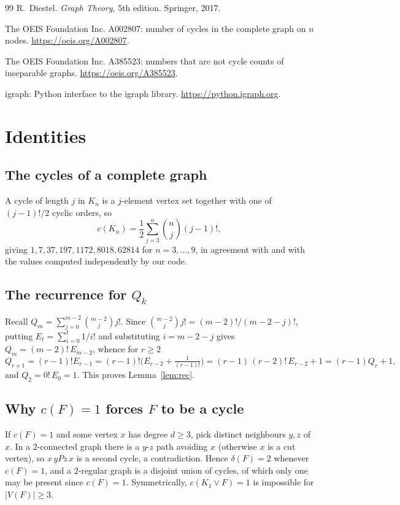 \documentclass[11pt,a4paper]{article}
\theoremstyle{definition}
\newcommand{\cF}{c(F)}
\begin{document}
\begin{thebibliography}{99}
R.~Diestel.
\newblock \emph{Graph Theory}, 5th edition.
\newblock Springer, 2017.

The OEIS Foundation Inc.
\newblock A002807: number of cycles in the complete graph on $n$ nodes.
\newblock \url{https://oeis.org/A002807}.

The OEIS Foundation Inc.
\newblock A385523: numbers that are not cycle counts of inseparable graphs.
\newblock \url{https://oeis.org/A385523}.

igraph: Python interface to the igraph library.
\newblock \url{https://python.igraph.org}.
\end{thebibliography}

\appendix

\section{Identities}\label{app:identities}

\subsection{The cycles of a complete graph}
A cycle of length $j$ in $K_n$ is a $j$-element vertex set together with one
of $(j-1)!/2$ cyclic orders, so
\[
  c(K_n)=\frac12\sum_{j=3}^{n}\binom nj (j-1)! ,
\]
giving $1,7,37,197,1172,8018,62814$ for $n=3,\dots,9$, in agreement with
\cite{oeisA002807} and with the values computed independently by our code.

\subsection{The recurrence for $Q_k$}
Recall $Q_m=\sum_{j=0}^{m-2}\binom{m-2}{j}j!$.  Since
$\binom{m-2}{j}j! = (m-2)!/(m-2-j)!$, putting
$E_t=\sum_{i=0}^{t}1/i!$ and substituting $i=m-2-j$ gives
$Q_m=(m-2)!\,E_{m-2}$, whence for $r\ge2$
\[
  Q_{r+1}=(r-1)!E_{r-1}
         =(r-1)!\Big(E_{r-2}+\tfrac{1}{(r-1)!}\Big)
         =(r-1)\,(r-2)!\,E_{r-2}+1
         =(r-1)Q_r+1 ,
\]
and $Q_2=0!\,E_0=1$.  This proves Lemma~\ref{lem:rec}.

\subsection{Why $\cF=1$ forces $F$ to be a cycle}
If $c(F)=1$ and some vertex $x$ has degree $d\ge 3$, pick distinct
neighbours $y,z$ of $x$.  In a $2$-connected graph there is a $y$-$z$ path
avoiding $x$ (otherwise $x$ is a cut vertex), so $x\,y P z\,x$ is a second
cycle, a contradiction.  Hence $\delta(F)=2$ whenever $c(F)=1$, and a
$2$-regular graph is a disjoint union of cycles, of which only one may be
present since $c(F)=1$.  Symmetrically, $c(K_1\vee F)=1$ is impossible for
$|V(F)|\ge 3$.
\end{document}
